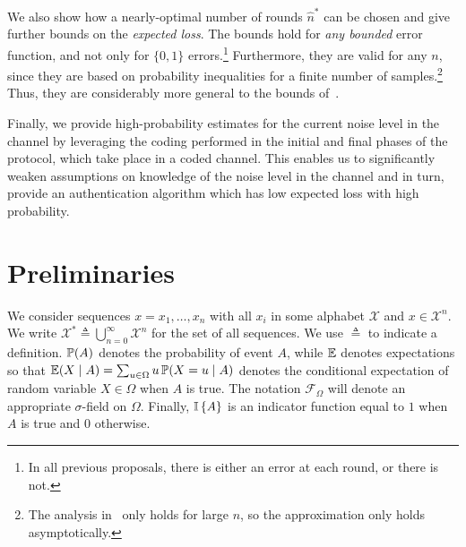 \documentclass[a4paper]{article}
\newcommand \defn {\mathrel{\triangleq}}
\renewcommand\Pr{\mathop{\mbox{\ensuremath{\mathbb{P}}}}\nolimits}
\newcommand\E{\mathop{\mbox{\ensuremath{\mathbb{E}}}}\nolimits}
\newcommand \hns {\hat{n}^*}
\newcommand \CX {\mathcal{X}}
\newcommand\ind[1]{\mathop{\mbox{\ensuremath{\mathbb{I}}}}\left\{#1\right\}}
\newcommand \Borel[1] {\mathcal{F}_{#1}}
\theoremstyle{plain} \newtheorem{remark}{Remark}
\theoremstyle{plain} \newtheorem{definition}{Definition}
\theoremstyle{plain} \newtheorem{example}{Example}
\theoremstyle{plain} \newtheorem{assumption}{Assumption}
\theoremstyle{plain} \newtheorem{conjecture}{Conjecture}
\theoremstyle{plain} \newtheorem{theorem}{Theorem}
\theoremstyle{plain} \newtheorem{proposition}{Proposition}
\theoremstyle{plain} \newtheorem{lemma}{Lemma}
\theoremstyle{plain} \newtheorem{corollary}{Corollary}
\begin{document}
We also show how a nearly-optimal number of rounds $\hns$ can be
chosen and give further bounds on the \textit{expected loss}.  The
bounds hold for {\em any bounded} error function, and not only for
$\{0, 1\}$ errors.\footnote{In all previous proposals, there is either
  an error at each round, or there is not.}  Furthermore, they are
valid for any $n$, since they are based on probability inequalities
for a finite number of samples.\footnote{The analysis
  in~\cite{singelee2} only holds for large $n$, so the approximation
  only holds asymptotically.} Thus, they are considerably more general
to the bounds of~\cite{singelee2}.

Finally, we provide high-probability estimates for the current noise
level in the channel by leveraging the coding performed in the initial
and final phases of the protocol, which take place in a coded
channel. This enables us to significantly weaken assumptions on
knowledge of the noise level in the channel and in turn, provide an
authentication algorithm which has low expected loss with high probability.









































\section{Preliminaries}
\label{sec:preliminaries}

We consider sequences $x = x_1, \ldots, x_n$ with all $x_i$ in some
alphabet $\CX$ and $x \in \CX^n$. We write $\CX^* \defn
\bigcup_{n=0}^\infty \CX^n$ for the set of all sequences. 
We use $\defn$ to indicate a definition.  $\Pr(A)$ denotes the
probability of event $A$, while $\E$ denotes expectations so that
$\E(X \mid A) = \sum_{u \in \Omega} u \Pr(X = u \mid A)$ denotes the
conditional expectation of random variable $X \in \Omega$ when $A$ is
true. The notation $\Borel{\Omega}$ will denote an appropriate
$\sigma$-field on $\Omega$. Finally, $\ind{A}$ is an indicator
function equal to $1$ when $A$ is true and $0$ otherwise.
\end{document}
